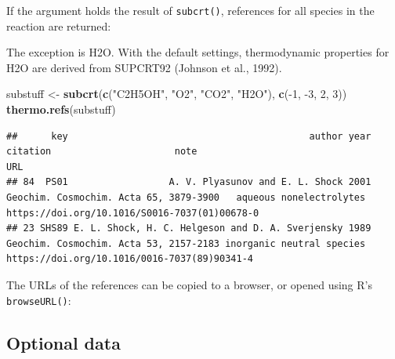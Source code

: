 \documentclass[]{tufte-handout}
\newenvironment{Shaded}{}{}
\newcommand{\KeywordTok}[1]{\textcolor[rgb]{0.00,0.44,0.13}{\textbf{#1}}}
\newcommand{\DecValTok}[1]{\textcolor[rgb]{0.25,0.63,0.44}{#1}}
\newcommand{\StringTok}[1]{\textcolor[rgb]{0.25,0.44,0.63}{#1}}
\newcommand{\OperatorTok}[1]{\textcolor[rgb]{0.40,0.40,0.40}{#1}}
\newcommand{\NormalTok}[1]{#1}
\begin{document}
If the argument holds the result of {\texttt{subcrt()}}, references for
all species in the reaction are returned:

\begin{marginfigure}
The exception is H2O. With the default settings, thermodynamic
properties for H2O are derived from SUPCRT92 (Johnson et al., 1992).
\end{marginfigure}

\begin{Shaded}
\begin{Highlighting}[]
\NormalTok{substuff <-}\StringTok{ }\KeywordTok{subcrt}\NormalTok{(}\KeywordTok{c}\NormalTok{(}\StringTok{"C2H5OH"}\NormalTok{, }\StringTok{"O2"}\NormalTok{, }\StringTok{"CO2"}\NormalTok{, }\StringTok{"H2O"}\NormalTok{), }\KeywordTok{c}\NormalTok{(}\OperatorTok{-}\DecValTok{1}\NormalTok{, }\OperatorTok{-}\DecValTok{3}\NormalTok{, }\DecValTok{2}\NormalTok{, }\DecValTok{3}\NormalTok{))}
\KeywordTok{thermo.refs}\NormalTok{(substuff)}
\end{Highlighting}
\end{Shaded}

\begin{verbatim}
##      key                                           author year                               citation                      note                                           URL
## 84  PS01                  A. V. Plyasunov and E. L. Shock 2001 Geochim. Cosmochim. Acta 65, 3879-3900   aqueous nonelectrolytes https://doi.org/10.1016/S0016-7037(01)00678-0
## 23 SHS89 E. L. Shock, H. C. Helgeson and D. A. Sverjensky 1989 Geochim. Cosmochim. Acta 53, 2157-2183 inorganic neutral species  https://doi.org/10.1016/0016-7037(89)90341-4
\end{verbatim}

The URLs of the references can be copied to a browser, or opened using
R's \texttt{browseURL()}:

\begin{Shaded}
\end{Shaded}

\hypertarget{optional-data}{\subsection{Optional
data}\label{optional-data}}
\end{document}
